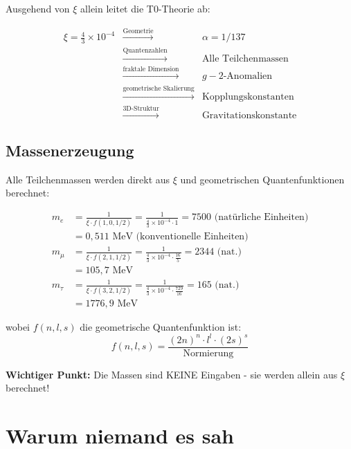 \documentclass[12pt,a4paper]{article}
\theoremstyle{definition}
\begin{document}
	Ausgehend von $\xi$ allein leitet die T0-Theorie ab:
	
	\begin{equation}
		\begin{array}{rcl}
			\xi = \frac{4}{3} \times 10^{-4} & \xrightarrow{\text{Geometrie}} & \alpha = 1/137\\
			& \xrightarrow{\text{Quantenzahlen}} & \text{Alle Teilchenmassen}\\
			& \xrightarrow{\text{fraktale Dimension}} & g-2\text{-Anomalien}\\
			& \xrightarrow{\text{geometrische Skalierung}} & \text{Kopplungskonstanten}\\
			& \xrightarrow{\text{3D-Struktur}} & \text{Gravitationskonstante}
		\end{array}
	\end{equation}
	
	\subsection{Massenerzeugung}
	
	Alle Teilchenmassen werden direkt aus $\xi$ und geometrischen Quantenfunktionen berechnet:
	
	\begin{align}
		m_e &= \frac{1}{\xi \cdot f(1,0,1/2)} = \frac{1}{\frac{4}{3} \times 10^{-4} \cdot 1} = 7500 \text{ (natürliche Einheiten)}\\
		&= 0,511 \text{ MeV (konventionelle Einheiten)}\\
		m_\mu &= \frac{1}{\xi \cdot f(2,1,1/2)} = \frac{1}{\frac{4}{3} \times 10^{-4} \cdot \frac{16}{5}} = 2344 \text{ (nat.)}\\
		&= 105,7 \text{ MeV}\\
		m_\tau &= \frac{1}{\xi \cdot f(3,2,1/2)} = \frac{1}{\frac{4}{3} \times 10^{-4} \cdot \frac{729}{16}} = 165 \text{ (nat.)}\\
		&= 1776,9 \text{ MeV}
	\end{align}
	
	wobei $f(n,l,s)$ die geometrische Quantenfunktion ist:
	\begin{equation}
		f(n,l,s) = \frac{(2n)^n \cdot l^l \cdot (2s)^s}{\text{Normierung}}
	\end{equation}
	
	\textbf{Wichtiger Punkt:} Die Massen sind KEINE Eingaben - sie werden allein aus $\xi$ berechnet!
	
	\section{Warum niemand es sah}
	
\end{document}
